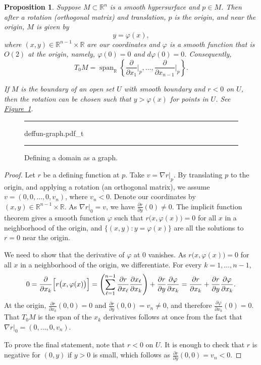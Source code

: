 \documentclass[12pt,openany]{book}
\newcommand{\avoidbreak}{\postdisplaypenalty=100}
\newcommand{\R}{{\mathbb{R}}}
\theoremstyle{plain}
\newtheorem{prop}[thm]{Proposition}
\theoremstyle{remark}
\theoremstyle{definition}
\newenvironment{myfig}{%
\begin{figure}[h!t]
\noindent\rule{\textwidth}{0.5pt}\vspace{12pt}\par\centering}%
{\par\noindent\rule{\textwidth}{0.5pt}
\end{figure}}
\theoremstyle{exercise}
\theoremstyle{example}
\newcommand{\figureref}[1]{\hyperref[#1]{Figure~\ref*{#1}}}
\begin{document}
\begin{prop} \label{prop:realgraphcoords}
Suppose $M \subset \R^n$ is a smooth hypersurface
and $p \in M$.  Then after a rotation (orthogonal matrix) and translation,
$p$ is the origin, and near the origin, $M$ is given by
\begin{equation*}
y = \varphi(x) ,
\end{equation*}
where $(x,y) \in \R^{n-1} \times \R$ are our coordinates and
$\varphi$ is a smooth
function that is $O(2)$ at the origin,
namely, $\varphi(0) = 0$ and $d\varphi(0) = 0$.
Consequently,
\begin{equation*}
T_0M = \operatorname{span}_{\R} \left\{
\frac{\partial}{\partial x_1}\Big|_p,
\ldots,
\frac{\partial}{\partial x_{n-1}}\Big|_p \right\} .
\end{equation*}

\nopagebreak
If $M$ is the boundary of an open set $U$ with smooth boundary and
$r < 0$ on $U$,
then the rotation can be chosen
such that $y > \varphi(x)$ for points in $U$.
See \figureref{fig:deffun-graph}.
\end{prop}

\begin{myfig}
{deffun-graph.pdf_t}
\caption{Defining a domain as a graph.\label{fig:deffun-graph}}
\end{myfig}

\begin{proof}
Let $r$ be a defining function at $p$.  Take $v = \nabla r|_p$.
By translating $p$ to the origin, and applying a rotation (an orthogonal matrix),
we assume $v = (0,0,\ldots,0,v_n)$, where $v_n < 0$.  Denote our
coordinates by $(x,y) \in \R^{n-1} \times \R$.  As $\nabla r|_0 =
v$, we have $\frac{\partial r}{\partial y}(0) \neq 0$.
The implicit function theorem gives a
smooth function $\varphi$ such that
$r\bigl(x,\varphi(x)\bigr) = 0$ for all $x$ in a neighborhood of the
origin, and $\bigl\{ (x,y) : y=\varphi(x) \bigr\}$ are all the
solutions to $r = 0$ near the origin.

We need to show that the derivative of $\varphi$ at $0$ vanishes.
As
$r\bigl(x,\varphi(x)\bigr) = 0$ for all $x$ in a neighborhood of the
origin, we differentiate.
For every $k=1,\ldots,n-1$,
\begin{equation*}
0 =
\frac{\partial}{\partial x_k} \Bigl[
r\bigl(x,\varphi(x)\bigr)
\Bigr]
=
\left(
\sum_{\ell=1}^{n-1}
\frac{\partial r}{\partial x_\ell}
\frac{\partial x_\ell}{\partial x_k}
\right)
+
\frac{\partial r}{\partial y}
\frac{\partial \varphi}{\partial x_k}
=
\frac{\partial r}{\partial x_k}
+
\frac{\partial r}{\partial y}
\frac{\partial \varphi}{\partial x_k} .
\avoidbreak
\end{equation*}
At the origin,
$\frac{\partial r}{\partial x_k}(0,0) = 0$ and
$\frac{\partial r}{\partial y}(0,0) = v_n \neq 0$, and therefore
$\frac{\partial \varphi}{\partial x_k}(0) = 0$.
That $T_0 M$ is the span of the $x_k$ derivatives
follows at once from the fact that $\nabla r|_0 = (0,\ldots,0,v_n)$.

To prove the final statement, note that
$r < 0$ on $U$.  It is enough to check that $r$ is
negative for $(0,y)$ if $y > 0$ is small, which follows as $\frac{\partial
r}{\partial y}(0,0) = v_n < 0$.
\end{proof}
\end{document}
